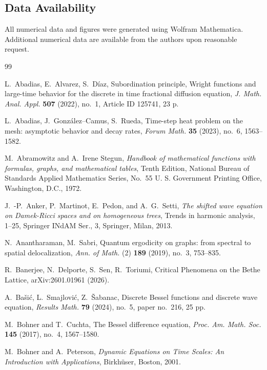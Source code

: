 \documentclass[12pt]{amsart}
\numberwithin{equation}{section}
\theoremstyle{boldremark}
\begin{document}
\subsection*{Data Availability}
All numerical data and figures were generated using Wolfram Mathematica. Additional numerical data are available from the authors upon reasonable request.

\begin{thebibliography}{99}

 L.~Abadias, E.~Alvarez, S.~D\'iaz, Subordination principle, Wright functions and large-time behavior for the discrete in time fractional diffusion equation, \emph{J. Math. Anal. Appl.} \textbf{507} (2022), no.~1, Article ID 125741, 23 p.

 L.~Abadias, J.~Gonz\'alez--Camus, S.~Rueda, Time-step heat problem on the mesh: asymptotic behavior and decay rates, \emph{Forum Math.} \textbf{35} (2023), no.~6, 1563--1582.

 M.~Abramowitz and A.~Irene Stegun, \emph{Handbook of
mathematical functions with formulas, graphs, and mathematical tables},
Tenth Edition, National Bureau of Standards Applied Mathematics Series, No.~55 U. S. Government Printing Office, Washington, D.C., 1972.

 J.~-P.~Anker, P.~Martinot, E.~Pedon, and A.~G.~Setti, 
\emph{The shifted wave equation on Damek-Ricci spaces and on homogeneous trees}, Trends in harmonic analysis, 1--25, Springer INdAM Ser., 3, Springer, Milan, 2013.

 N.~Anantharaman, M.~Sabri, Quantum ergodicity on graphs: from spectral to spatial delocalization, \emph{Ann. of Math.} (2) \textbf{189} (2019), no.~3, 753--835.

 R.~Banerjee, N.~Delporte, S.~Sen, R.~Toriumi, Critical Phenomena on the Bethe Lattice, arXiv:2601.01961 (2026).

 A.~Ba\v{s}i\'{c}, L.~Smajlovi\'{c}, Z.~\v{S}abanac, Discrete Bessel functions and discrete wave equation, \emph{Results Math.} \textbf{79} (2024), no.~5, paper no.~216, 25 pp.

 M.~Bohner and T.~Cuchta, The Bessel difference equation, \emph{Proc. Am. Math. Soc.} \textbf{145} (2017), no.~4, 1567--1580.

 M.~Bohner and A.~Peterson, \emph{Dynamic Equations on Time Scales: An Introduction with Applications}, Birkh\"{u}ser, Boston, 2001.


\end{thebibliography}
\end{document}
